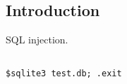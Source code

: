 
\subsection{Introduction}

SQL injection. 

\begin{verbatim}

$sqlite3 test.db; .exit
\end{verbatim}
